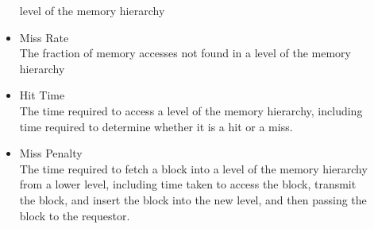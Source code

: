 \documentclass{report}
\begin{document}
\begin{description}
\begin{itemize}
                level of the memory hierarchy
            \item Miss Rate\\
                The fraction of memory accesses not found in
                a level of the memory hierarchy
            \item Hit Time\\
                The time required to access a level of the
                memory hierarchy, including time required to
                determine whether it is a hit or a miss.
            \item Miss Penalty\\
                The time required to fetch a block into a
                level of the memory hierarchy from a lower
                level, including time taken to access the block,
                transmit the block, and insert the block into the
                new level, and then passing the block to the
                requestor.
        \end{itemize}


\end{description}
\end{document}
